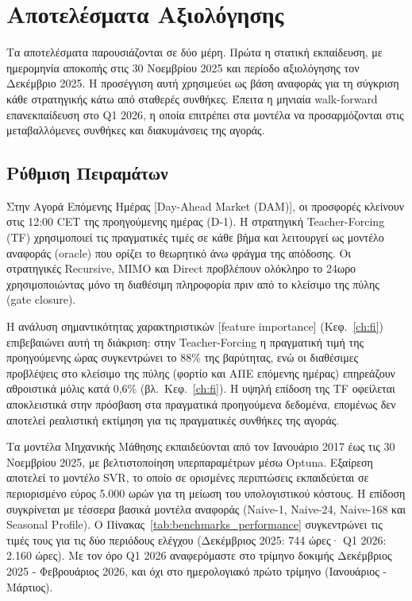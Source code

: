 \chapter{Αποτελέσματα Αξιολόγησης}
\label{ch:experiments}

Τα αποτελέσματα παρουσιάζονται σε δύο μέρη. Πρώτα η στατική εκπαίδευση, με ημερομηνία
αποκοπής στις 30 Νοεμβρίου 2025 και περίοδο αξιολόγησης τον Δεκέμβριο 2025. Η
προσέγγιση αυτή χρησιμεύει ως βάση αναφοράς για τη σύγκριση κάθε στρατηγικής κάτω από
σταθερές συνθήκες. Έπειτα η μηνιαία walk-forward επανεκπαίδευση στο Q1 2026, η οποία
επιτρέπει στα μοντέλα να προσαρμόζονται στις μεταβαλλόμενες συνθήκες και διακυμάνσεις
της αγοράς.

\section{Ρύθμιση Πειραμάτων}
\label{sec:exp_setup}

Στην Αγορά Επόμενης Ημέρας [Day-Ahead Market (DAM)], οι προσφορές κλείνουν στις 12:00 CET
της προηγούμενης ημέρας (D-1). Η στρατηγική Teacher-Forcing (TF) χρησιμοποιεί τις πραγματικές
τιμές σε κάθε βήμα και λειτουργεί ως μοντέλο αναφοράς (oracle) που ορίζει το θεωρητικό άνω
φράγμα της απόδοσης. Οι στρατηγικές Recursive, MIMO και Direct προβλέπουν ολόκληρο το 24ωρο
χρησιμοποιώντας μόνο τη διαθέσιμη πληροφορία πριν από το κλείσιμο της πύλης (gate closure).

Η ανάλυση σημαντικότητας χαρακτηριστικών [feature importance] (Κεφ.~\ref{ch:fi})
επιβεβαιώνει αυτή τη διάκριση: στην Teacher-Forcing η πραγματική τιμή της προηγούμενης ώρας
συγκεντρώνει το 88\% της βαρύτητας, ενώ οι διαθέσιμες προβλέψεις στο κλείσιμο της πύλης
(φορτίο και ΑΠΕ επόμενης ημέρας) επηρεάζουν αθροιστικά μόλις κατά 0,6\% (βλ.\ Κεφ.~\ref{ch:fi}). Η υψηλή επίδοση
της TF οφείλεται αποκλειστικά στην πρόσβαση στα πραγματικά προηγούμενα δεδομένα, επομένως
δεν αποτελεί ρεαλιστική εκτίμηση για τις πραγματικές συνθήκες της αγοράς.

Τα μοντέλα Μηχανικής Μάθησης εκπαιδεύονται από τον Ιανουάριο 2017 έως τις 30 Νοεμβρίου 2025,
με βελτιστοποίηση υπερπαραμέτρων μέσω Optuna. Εξαίρεση αποτελεί το μοντέλο SVR, το οποίο
σε ορισμένες περιπτώσεις εκπαιδεύεται σε περιορισμένο εύρος 5.000 ωρών για τη μείωση του
υπολογιστικού κόστους. Η επίδοση συγκρίνεται με τέσσερα βασικά μοντέλα αναφοράς (Naive-1,
Naive-24, Naive-168 και Seasonal Profile). Ο Πίνακας~\ref{tab:benchmarks_performance}
συγκεντρώνει τις τιμές τους για τις δύο περιόδους ελέγχου (Δεκέμβριος 2025: 744 ώρες·
Q1 2026: 2.160 ώρες). Με τον όρο Q1 2026 αναφερόμαστε στο τρίμηνο δοκιμής
Δεκέμβριος 2025 - Φεβρουάριος 2026, και όχι στο ημερολογιακό πρώτο τρίμηνο
(Ιανουάριος - Μάρτιος).

